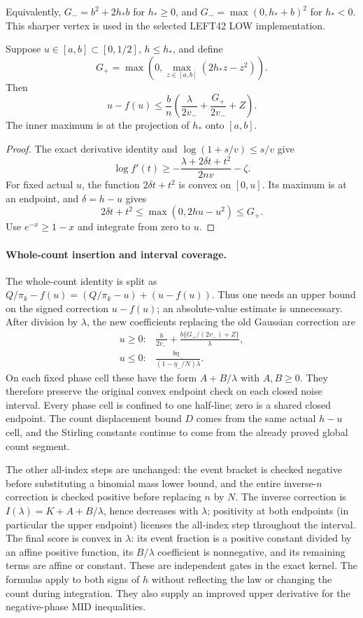 Equivalently, $G_-=b^2+2h_*b$ for $h_*\ge0$, and
$G_-=\max(0,h_*+b)^2$ for $h_*<0$. This sharper vertex is used in the
selected LEFT42 LOW implementation.

\begin{lemma}
Suppose $u\in[a,b]\subset[0,1/2]$, $h\le h_*$, and define
\[
 G_+=\max\left(0,\max_{z\in[a,b]}(2h_*z-z^2)\right).
\]
Then
\[
 u-f(u)\le\frac b n
       \left(\frac\lambda{2v_-}+\frac{G_+}{2v_-}+Z\right).
\]
The inner maximum is at the projection of $h_*$ onto $[a,b]$.
\end{lemma}
\begin{proof}
The exact derivative identity and $\log(1+s/v)\le s/v$ give
\[
 \log f'(t)\ge-\frac{\lambda+2\delta t+t^2}{2nv}-\zeta.
\]
For fixed actual $u$, the function $2\delta t+t^2$ is convex on $[0,u]$.
Its maximum is at an endpoint, and $\delta=h-u$ gives
\[
 2\delta t+t^2\le\max(0,2hu-u^2)\le G_+.
\]
Use $e^{-x}\ge1-x$ and integrate from zero to $u$.
\end{proof}

\paragraph{Whole-count insertion and interval coverage.}
The whole-count identity is split as
$Q/\pi_k-f(u)=(Q/\pi_k-u)+(u-f(u))$.
Thus one needs an upper bound on the signed correction $u-f(u)$;
an absolute-value estimate is unnecessary. After division by $\lambda$,
the new coefficients replacing the old Gaussian correction are
\[
 \begin{array}{ll}
 u\ge0:&\displaystyle
 \frac b{2v_-}+\frac{b\{G_+/(2v_-)+Z\}}\lambda,\\[6pt]
 u\le0:&\displaystyle
 \frac{b\eta_-}{(1-\eta_-/N)\lambda}.
 \end{array}
\]
On each fixed phase cell these have the form $A+B/\lambda$ with
$A,B\ge0$. They therefore preserve the original convex endpoint check on
each closed noise interval. Every phase cell is confined to one half-line;
zero is a shared closed endpoint. The count displacement bound $D$ comes
from the same actual $h-u$ cell, and the Stirling constants continue to
come from the already proved global count segment.

The other all-index steps are unchanged: the event bracket is checked
negative before substituting a binomial mass lower bound, and the entire
inverse-$n$ correction is checked positive before replacing $n$ by $N$.
The inverse correction is $I(\lambda)=K+A+B/\lambda$, hence decreases with $\lambda$; positivity at both endpoints (in particular the upper endpoint) licenses the all-index step throughout the interval. The final score is convex in $\lambda$: its event fraction is a positive constant divided by an affine positive function, its $B/\lambda$ coefficient is nonnegative, and its remaining terms are affine or constant. These are independent gates in the exact kernel. The formulas apply to
both signs of $h$ without reflecting the law or changing the count during
integration. They also supply an improved upper derivative for the
negative-phase MID inequalities.
